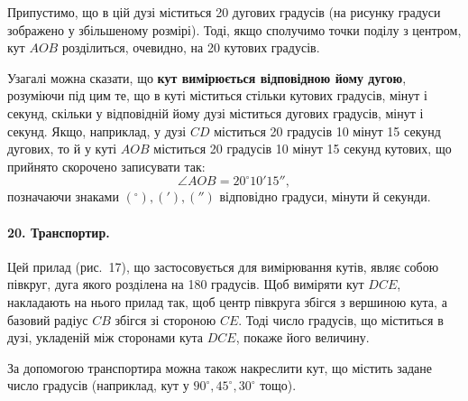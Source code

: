 Припустимо, що в цій дузі міститься 20 дугових градусів (на рисунку градуси зображено у збільшеному розмірі). Тоді, якщо сполучимо точки поділу з центром, кут $AOB$ розділиться, очевидно, на 20 кутових градусів.

Узагалі можна сказати, що \textbf{кут вимірюється відповідною йому дугою}, розуміючи під цим те, що в куті міститься стільки кутових градусів, мінут і секунд, скільки у відповідній йому дузі міститься дугових градусів, мінут і секунд. Якщо, наприклад, у дузі $CD$ міститься 20 градусів 10 мінут 15 секунд дугових, то й у куті $AOB$ міститься 20 градусів 10 мінут 15 секунд кутових, що прийнято скорочено записувати так:
\[
\angle AOB = 20^\circ 10' 15'',
\]
позначаючи знаками $(^\circ), ('), ('')$ відповідно градуси, мінути й секунди.

\paragraph{20. Транспортир.}
Цей прилад (рис.~17), що застосовується для вимірювання кутів, являє собою півкруг, дуга якого розділена на 180 градусів. Щоб виміряти кут $DCE$, накладають на нього прилад так, щоб центр півкруга збігся з вершиною кута, а базовий радіус $CB$ збігся зі стороною $CE$. Тоді число градусів, що міститься в дузі, укладеній між сторонами кута $DCE$, покаже його величину.

За допомогою транспортира можна також накреслити кут, що містить задане число градусів (наприклад, кут у $90^\circ, 45^\circ, 30^\circ$ тощо).

\begin{center}
\end{center}

